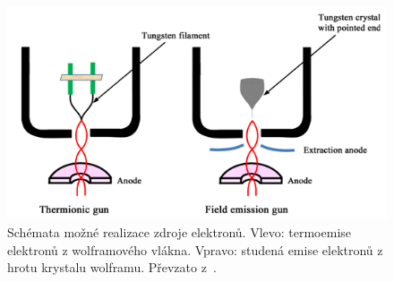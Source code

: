 \begin{figure}[htbp!]
	\centering
	\includegraphics[width = 350 pt]{CFE.png}
	\caption{Schémata možné realizace zdroje elektronů. Vlevo: termoemise elektronů z wolframového vlákna. Vpravo: studená emise elektronů z hrotu krystalu wolframu. Převzato z~\cite{zdrojel}.}
	\label{CFE}
\end{figure}

